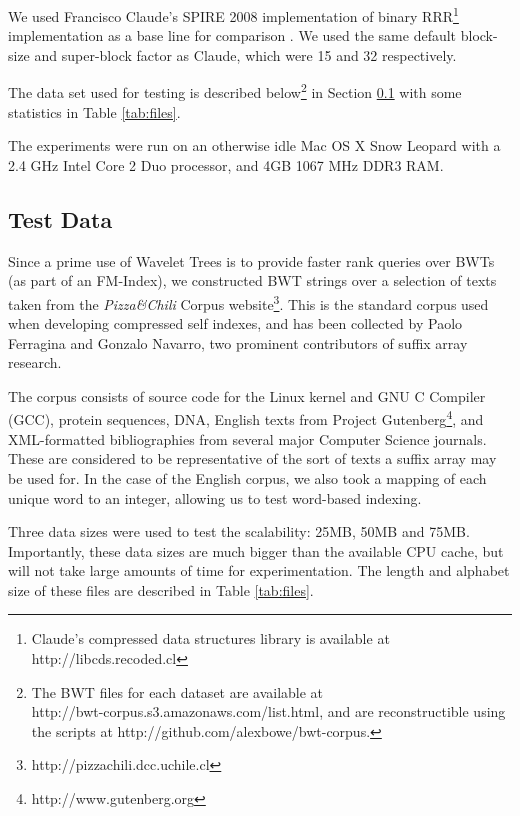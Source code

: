 We used Francisco Claude's SPIRE 2008 implementation of binary 
RRR\footnote{Claude's compressed data 
structures library is available at http://libcds.recoded.cl} implementation as a 
base line for comparison \cite{claude2008}. We used the same default block-size 
and super-block factor as Claude, which were 15 and 32 respectively.

The data set used for testing is described below\footnote{The BWT files for each 
dataset are 
available at\\ http://bwt-corpus.s3.amazonaws.com/list.html, and are 
reconstructible using the scripts at http://github.com/alexbowe/bwt-corpus.} in 
Section \ref{sec:data} with some statistics in Table \ref{tab:files}.

The experiments were run on an otherwise idle Mac OS X Snow Leopard with a 2.4 
GHz Intel Core 2 Duo processor, and 4GB 1067 MHz DDR3 RAM.

\subsection{Test Data}
\label{sec:data}
Since a prime use of Wavelet Trees is to provide faster rank queries over BWTs 
(as part of an FM-Index), we
constructed BWT strings over a selection of texts taken from the 
\emph{Pizza\&Chili}
Corpus website\footnote{http://pizzachili.dcc.uchile.cl}. This is the standard
corpus used when developing compressed self indexes, and has been collected by
Paolo Ferragina and Gonzalo Navarro, two prominent contributors of suffix array 
research.

The corpus consists of source code for the Linux kernel and GNU C Compiler
(GCC), protein sequences, DNA, English texts from Project
Gutenberg\footnote{http://www.gutenberg.org}, and XML-formatted bibliographies
from several major Computer Science journals. These are considered to be
representative of the sort of texts a suffix array may be used for. In the 
case of the English corpus, we also took a mapping of each unique word to an 
integer, allowing us to test word-based indexing.

Three data sizes were used to test the scalability: 25MB, 50MB and 75MB. 
Importantly, these data sizes are much bigger than the available CPU cache, but
will not take large amounts of time for experimentation. The length and alphabet 
size of these files are described in Table \ref{tab:files}.

